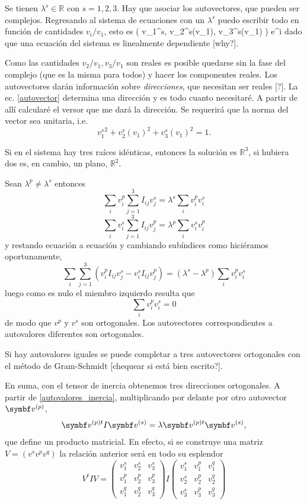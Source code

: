 \documentclass[10pt,oneside]{CBFT_book}
\begin{document}
Se tienen $\lambda^s \in \mathbb{R}$ con $s=1,2,3$. Hay que asociar los autovectores, que pueden ser
complejos. Regresando al sistema de ecuaciones con un $\lambda^s$ puedo escribir todo en función
de cantidades $v_i/v_1$, esto es
\be
	( v_1^s, v_2^s(v_1), v_3^s(v_1) )\: e^{i\phi}
	\label{autovector}
\ee
dado que una ecuación del sistema es linealmente dependiente [why?].

Como las cantidades $v_2/v_1, v_3/v_1 $ son reales es posible quedarse sin la fase del complejo (que es
la misma para todos) y hacer los componentes reales. 
Los autovectores darán información sobre {\it direcciones}, que necesitan ser reales [?].
La ec. \eqref{autovector} determina una dirección y es todo cuanto necesitaré. A partir de allí calcularé
el versor que me dará la dirección.
Se requerirá que la norma del vector sea unitaria, i.e. 
\[
	{v_1^s}^2 +  {v_2^s(v_1)}^2 + {v_3^s(v_1)}^2 = 1.
\]

Si en el sistema hay tres raíces idénticas, entonces la solución es $\mathbb{R}^3$, si hubiera dos es,
en cambio, un plano, $\mathbb{R}^2$.

Sean $\lambda^p \neq \lambda^s$ entonces 
\[
	\sum_i v_i^p \sum_{j=1}^3 I_{ij} v_j^s = \lambda^s \sum_i v_i^p  v_i^s
\]
\[
	\sum_i v_i^s \sum_{j=1}^3 I_{ij} v_j^p = \lambda^p \sum_i v_i^s v_i^p
\]
y restando ecuación a ecuación y cambiando subíndices como hiciéramos oportunamente,
\[
	\sum_i \sum_{j=1}^3 ( v_i^p I_{ij} v_j^s - v_i^s I_{ij} v_j^p ) =
	(\lambda^s - \lambda^p )\sum_i v_i^p v_i^s 
\]
luego como es nulo el miembro izquierdo resulta que 
\[
	\sum_i v_i^p v_i^s = 0
\]
de modo que $v^p$ y $v^s$ son ortogonales. Los autovectores correspondientes a autovalores 
diferentes son ortogonales.

Si hay autovalores iguales se puede completar a tres autovectores ortogonales con el método de
Gram-Schmidt [chequear si está bien escrito?].

En suma, con el tensor de inercia obtenemos tres direcciones ortogonales.
A partir de \eqref{autovalores_inercia}, multiplicando por delante por otro autovector $\vb{v}^{(p)}$,
\[
	\vb{v}^{(p) t} I \vb{v}^{(s)} = \lambda \vb{v}^{(p) t}  \vb{v}^{(s)},
\]
que define un producto matricial. En efecto, si se construye una matriz $V = ( v^s v^p v^q)$ la 
relación anterior será en todo su esplendor
\[
	V^t I V = \begin{pmatrix}
	           v_1^s & v_2^s & v_3^s \\
	           v_1^p & v_2^p & v_3^p \\
	           v_1^q & v_2^q & v_3^q
	          \end{pmatrix}
	          I
		\begin{pmatrix}
	           v_1^s & v_1^p & v_1^q  \\
	           v_2^s & v_2^p & v_2^q \\
	           v_3^s & v_3^p & v_3^q
	          \end{pmatrix}
\]
\end{document}
